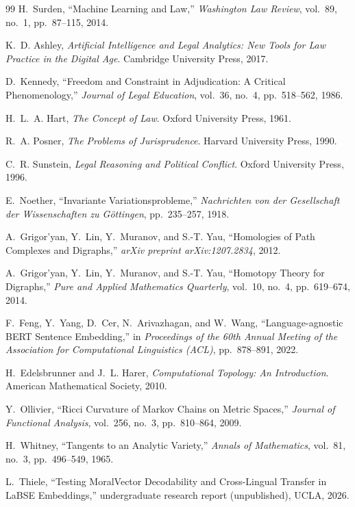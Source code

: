 \documentclass[12pt]{article}
\theoremstyle{definition}
\theoremstyle{remark}
\begin{document}
\begin{thebibliography}{99}
H.~Surden, ``Machine Learning and Law,'' \emph{Washington Law Review}, vol.~89, no.~1, pp.~87--115, 2014.

K.~D. Ashley, \emph{Artificial Intelligence and Legal Analytics: New Tools for Law Practice in the Digital Age}. Cambridge University Press, 2017.

D.~Kennedy, ``Freedom and Constraint in Adjudication: A Critical Phenomenology,'' \emph{Journal of Legal Education}, vol.~36, no.~4, pp.~518--562, 1986.

H.~L.~A. Hart, \emph{The Concept of Law}. Oxford University Press, 1961.

R.~A. Posner, \emph{The Problems of Jurisprudence}. Harvard University Press, 1990.

C.~R. Sunstein, \emph{Legal Reasoning and Political Conflict}. Oxford University Press, 1996.

E.~Noether, ``Invariante Variationsprobleme,'' \emph{Nachrichten von der Gesellschaft der Wissenschaften zu G\"{o}ttingen}, pp.~235--257, 1918.

A.~Grigor'yan, Y.~Lin, Y.~Muranov, and S.-T. Yau, ``Homologies of Path Complexes and Digraphs,'' \emph{arXiv preprint arXiv:1207.2834}, 2012.

A.~Grigor'yan, Y.~Lin, Y.~Muranov, and S.-T. Yau, ``Homotopy Theory for Digraphs,'' \emph{Pure and Applied Mathematics Quarterly}, vol.~10, no.~4, pp.~619--674, 2014.

F.~Feng, Y.~Yang, D.~Cer, N.~Arivazhagan, and W.~Wang, ``Language-agnostic BERT Sentence Embedding,'' in \emph{Proceedings of the 60th Annual Meeting of the Association for Computational Linguistics (ACL)}, pp.~878--891, 2022.

H.~Edelsbrunner and J.~L. Harer, \emph{Computational Topology: An Introduction}. American Mathematical Society, 2010.

Y.~Ollivier, ``Ricci Curvature of Markov Chains on Metric Spaces,'' \emph{Journal of Functional Analysis}, vol.~256, no.~3, pp.~810--864, 2009.

H.~Whitney, ``Tangents to an Analytic Variety,'' \emph{Annals of Mathematics}, vol.~81, no.~3, pp.~496--549, 1965.

L.~Thiele, ``Testing MoralVector Decodability and Cross-Lingual Transfer in LaBSE Embeddings,'' undergraduate research report (unpublished), UCLA, 2026.

\end{thebibliography}
\end{document}
